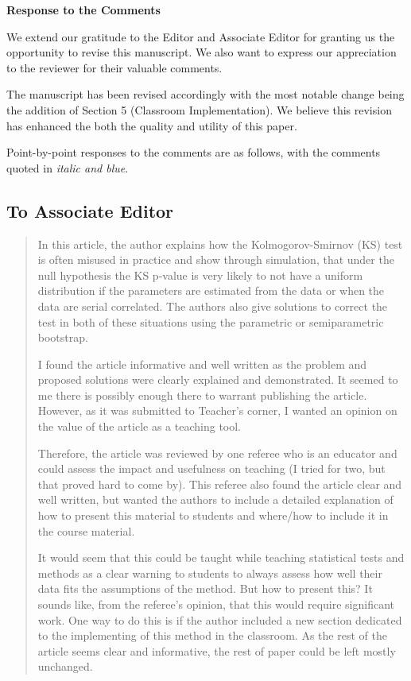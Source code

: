 \documentclass[12pt]{article}
\newenvironment{comment}%
{\begin{quotation}\noindent\small\it\color{darkblue}\ignorespaces%
}{\end{quotation}}
\begin{document}
\begin{center}
  {\Large\bf Response to the Comments}
\end{center}

We extend our gratitude to the Editor and Associate Editor for 
granting us the opportunity to revise this manuscript. We also want to
express our appreciation to the reviewer for their valuable comments. 


The manuscript has been revised accordingly with the most notable change being 
the addition of Section 5 (Classroom Implementation). We believe this revision 
has enhanced the both the quality and utility of this paper.


Point-by-point responses to the comments are as follows, with the
comments quoted in \emph{\color{darkblue} italic and blue}.

\subsection*{To Associate Editor}

\begin{comment}
In this article, the author explains how the Kolmogorov-Smirnov (KS) test is 
often misused in practice and show through simulation, that under the null 
hypothesis the KS p-value is very likely to not have a uniform distribution if 
the parameters are estimated from the data or when the data are serial 
correlated. The authors also give solutions to correct the test in both of these 
situations using the parametric or semiparametric bootstrap.


I found the article informative and well written as the problem and proposed 
solutions were clearly explained and demonstrated. It seemed to me there is 
possibly enough there to warrant publishing the article. However, as it was 
submitted to Teacher’s corner, I wanted an opinion on the value of the article
as a teaching tool.


Therefore, the article was reviewed by one referee who is an educator and could 
assess the impact and usefulness on teaching (I tried for two, but that proved 
hard to come by). This referee also found the article clear and well written, 
but wanted the authors to include a detailed explanation of how to present
this material to students and where/how to include it in the course material.


It would seem that this could be taught while teaching statistical tests and 
methods as a clear warning to students to always assess how well their data fits 
the assumptions of the method. But how to present this? It sounds like, from the 
referee’s opinion, that this would require significant work. One way to do this 
is if the author included a new section dedicated to the implementing of this 
method in the classroom. As the rest of the article seems clear and informative, 
the rest of paper could be left mostly unchanged.
\end{comment}
\end{document}
